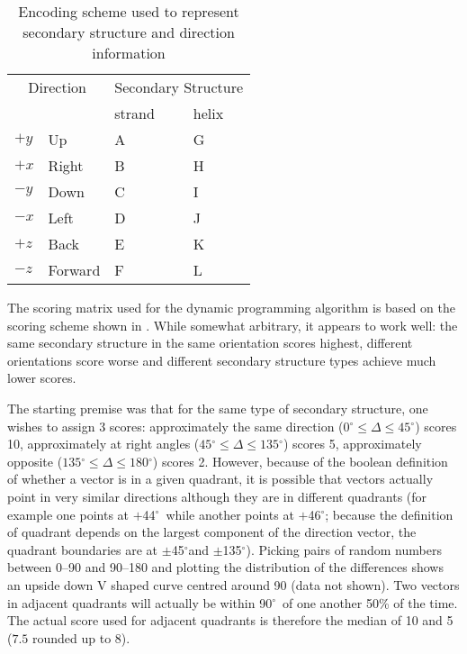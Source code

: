 \documentclass{article}
\newcommand{\degrees}{\mbox{${}^{\circ}$}}
\begin{document}
\begin{table}
\caption{\label{tab:encoding}Encoding scheme used to represent
          secondary structure and direction information}
\begin{center}
\begin{tabularx}{\linewidth}{XXll} \hline
\multicolumn{2}{c}{Direction} & \multicolumn{2}{c}{Secondary Structure}\\ \cline{3-4}
          &         & strand & helix  \\ \hline
$+y$      & Up      & A      & G      \\
$+x$      & Right   & B      & H      \\
$-y$      & Down    & C      & I      \\
$-x$      & Left    & D      & J      \\
$+z$      & Back    & E      & K      \\
$-z$      & Forward & F      & L      \\ \hline
\end{tabularx}
\end{center}
\end{table}

The scoring matrix used for the dynamic programming algorithm is based
on the scoring scheme shown in \tableref{\ref{tab:matrix}}. While somewhat
arbitrary, it appears to work well: the same secondary structure in
the same orientation scores highest, different orientations score
worse and different secondary structure types achieve much lower
scores.

The starting premise was that for the same type of secondary
structure, one wishes to assign 3 scores: approximately the same
direction ($0\degrees\le\Delta\le 45\degrees$) scores 10,
approximately at right angles ($45\degrees\le\Delta\le 135\degrees$)
scores 5, approximately opposite ($135\degrees\le\Delta\le
180\degrees$) scores 2.  However, because of the boolean definition of
whether a vector is in a given quadrant, it is possible that vectors
actually point in very similar directions although they are in
different quadrants (for example one points at $+$44\degrees\ while
another points at $+$46\degrees; because the definition of quadrant
depends on the largest component of the direction vector, the quadrant
boundaries are at $\pm$45\degrees and $\pm$135\degrees). Picking pairs
of random numbers between 0--90 and 90--180 and plotting the
distribution of the differences shows an upside down V shaped curve
centred around 90 (data not shown). Two vectors in adjacent quadrants
will actually be within 90\degrees\ of one another 50\% of the
time. The actual score used for adjacent quadrants is therefore the
median of 10 and 5 ($7.5$ rounded up to 8).
\end{document}
